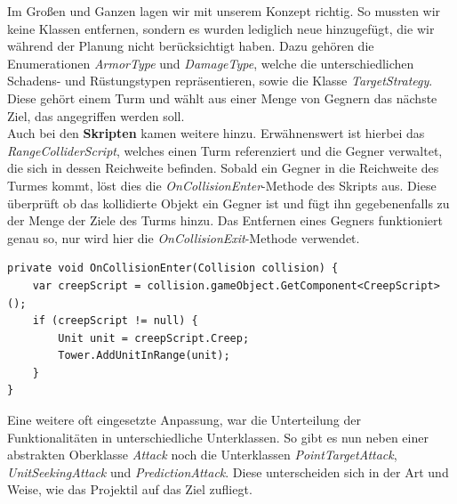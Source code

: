 Im Großen und Ganzen lagen wir mit unserem Konzept richtig. So mussten wir keine Klassen entfernen, sondern es wurden lediglich neue hinzugefügt, die wir während der Planung nicht berücksichtigt haben. Dazu gehören die Enumerationen \textit{ArmorType} und \textit{DamageType}, welche die unterschiedlichen Schadens- und Rüstungstypen repräsentieren, sowie die Klasse \textit{TargetStrategy}. Diese gehört einem Turm und wählt aus einer Menge von Gegnern das nächste Ziel, das angegriffen werden soll.\\
Auch bei den \textbf{\textcolor{ScriptClass}{Skripten}} kamen weitere hinzu. Erwähnenswert ist hierbei das \textit{RangeColliderScript}, welches einen Turm referenziert und die Gegner verwaltet, die sich in dessen Reichweite befinden. Sobald ein Gegner in die Reichweite des Turmes kommt, löst dies die \textit{OnCollisionEnter}-Methode des Skripts aus. Diese überprüft ob das kollidierte Objekt ein Gegner ist und fügt ihn gegebenenfalls zu der Menge der Ziele des Turms hinzu. Das Entfernen eines Gegners funktioniert genau so, nur wird hier die \textit{OnCollisionExit}-Methode verwendet.
\\
\begin{lstlisting}[caption={[\textit{OnCollisionEnter}-Methode des \textit{RangeColliderScripts}]\textit{OnCollisionEnter}-Methode des \textit{RangeColliderScripts}}]
private void OnCollisionEnter(Collision collision) {
	var creepScript = collision.gameObject.GetComponent<CreepScript>();
	if (creepScript != null) {
		Unit unit = creepScript.Creep;
		Tower.AddUnitInRange(unit);
	}
}
\end{lstlisting}

Eine weitere oft eingesetzte Anpassung, war die Unterteilung der Funktionalitäten in unterschiedliche Unterklassen. So gibt es nun neben einer abstrakten Oberklasse \textit{Attack} noch die Unterklassen \textit{PointTargetAttack}, \textit{UnitSeekingAttack} und \textit{PredictionAttack}. Diese unterscheiden sich in der Art und Weise, wie das Projektil auf das Ziel zufliegt.

